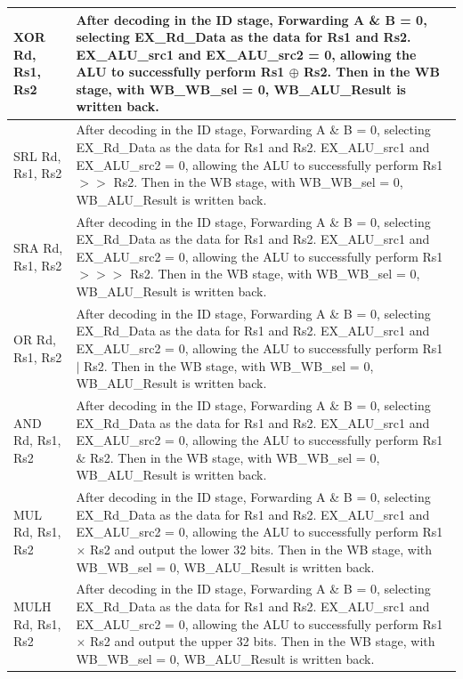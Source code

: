 \documentclass[12pt,a4paper]{report}
\begin{document}
\begin{longtable}{|l|p{12cm}|}
XOR Rd, Rs1, Rs2 & After decoding in the ID stage, Forwarding A \& B = 0, selecting EX\_Rd\_Data as the data for Rs1 and Rs2. EX\_ALU\_src1 and EX\_ALU\_src2 = 0, allowing the ALU to successfully perform Rs1 $\oplus$ Rs2. Then in the WB stage, with WB\_WB\_sel = 0, WB\_ALU\_Result is written back. \\
\hline

SRL Rd, Rs1, Rs2 & After decoding in the ID stage, Forwarding A \& B = 0, selecting EX\_Rd\_Data as the data for Rs1 and Rs2. EX\_ALU\_src1 and EX\_ALU\_src2 = 0, allowing the ALU to successfully perform Rs1 $>>$ Rs2. Then in the WB stage, with WB\_WB\_sel = 0, WB\_ALU\_Result is written back. \\
\hline

SRA Rd, Rs1, Rs2 & After decoding in the ID stage, Forwarding A \& B = 0, selecting EX\_Rd\_Data as the data for Rs1 and Rs2. EX\_ALU\_src1 and EX\_ALU\_src2 = 0, allowing the ALU to successfully perform Rs1 $>>>$ Rs2. Then in the WB stage, with WB\_WB\_sel = 0, WB\_ALU\_Result is written back. \\
\hline

OR Rd, Rs1, Rs2 & After decoding in the ID stage, Forwarding A \& B = 0, selecting EX\_Rd\_Data as the data for Rs1 and Rs2. EX\_ALU\_src1 and EX\_ALU\_src2 = 0, allowing the ALU to successfully perform Rs1 $|$ Rs2. Then in the WB stage, with WB\_WB\_sel = 0, WB\_ALU\_Result is written back. \\
\hline

AND Rd, Rs1, Rs2 & After decoding in the ID stage, Forwarding A \& B = 0, selecting EX\_Rd\_Data as the data for Rs1 and Rs2. EX\_ALU\_src1 and EX\_ALU\_src2 = 0, allowing the ALU to successfully perform Rs1 $\&$ Rs2. Then in the WB stage, with WB\_WB\_sel = 0, WB\_ALU\_Result is written back. \\
\hline

MUL Rd, Rs1, Rs2 & After decoding in the ID stage, Forwarding A \& B = 0, selecting EX\_Rd\_Data as the data for Rs1 and Rs2. EX\_ALU\_src1 and EX\_ALU\_src2 = 0, allowing the ALU to successfully perform Rs1 $\times$ Rs2 and output the lower 32 bits. Then in the WB stage, with WB\_WB\_sel = 0, WB\_ALU\_Result is written back. \\
\hline

MULH Rd, Rs1, Rs2 & After decoding in the ID stage, Forwarding A \& B = 0, selecting EX\_Rd\_Data as the data for Rs1 and Rs2. EX\_ALU\_src1 and EX\_ALU\_src2 = 0, allowing the ALU to successfully perform Rs1 $\times$ Rs2 and output the upper 32 bits. Then in the WB stage, with WB\_WB\_sel = 0, WB\_ALU\_Result is written back. \\
\hline


\end{longtable}
\end{document}
